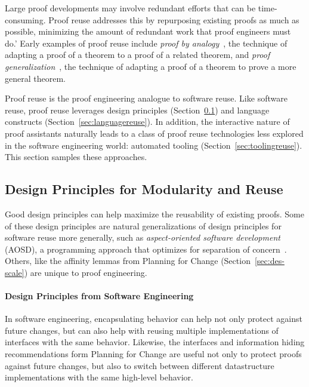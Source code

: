 Large proof developments may involve redundant efforts that can be time-consuming.
Proof reuse addresses this by repurposing existing proofs as much as possible,
minimizing the amount of redundant work that proof engineers must do.'
Early examples of proof reuse include \textit{proof by analogy}~\citep{curien1995},
the technique of adapting a proof of a theorem to a proof of a related theorem,
and \textit{proof generalization}~\citep{hasker1992generalization}, the technique of
adapting a proof of a theorem to prove a more general theorem.

Proof reuse is the proof engineering analogue to software reuse.
Like software reuse, proof reuse leverages design principles (Section~\ref{sec:designreuse}) and language constructs (Section~\ref{sec:languagereuse}).
In addition, the interactive nature of proof assistants naturally leads to a class of proof reuse technologies less explored
in the software engineering world: automated tooling (Section~\ref{sec:toolingreuse}).
This section samples these approaches.

\subsection{Design Principles for Modularity and Reuse}
\label{sec:designreuse}

Good design principles can help maximize the reusability of existing proofs.
Some of these design principles are natural generalizations of design principles
for software reuse more generally, such as \textit{aspect-oriented software development} (AOSD),
a programming approach that optimizes for separation of concern~\citep{Filman2004}.
Others, like the affinity lemmas from Planning for Change (Section~\ref{sec:des-scale}) are unique to proof engineering.

\paragraph{Design Principles from Software Engineering}
In software engineering, encapsulating behavior can help not only protect
against future changes, but can also help with reusing multiple implementations
of interfaces with the same behavior. Likewise, the interfaces and information hiding recommendations form
Planning for Change are useful not only to protect proofs against future changes, but also
to switch between different datastructure implementations with the same high-level behavior.

